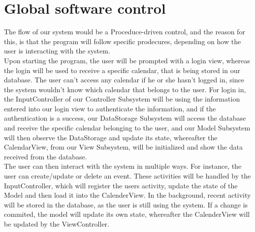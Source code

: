 \section{Global software control}
The flow of our system would be a Proceduce-driven control, and the reason for this, is that the program will follow specific prodecures, depending on how the user is interacting with the system.\\

Upon starting the program, the user will be prompted with a login view, whereas the login will be used to receive a specific calendar, that is being stored in our database. The user can't access any calendar if he or she hasn't logged in, since the system wouldn't know which calendar that belongs to the user.
For login in, the InputController of our Controller Subsystem will be using the information entered into our login view to authenticate the information, and if the authentication is a success, our DataStorage Subsystem will access the database and receive the specific calendar belonging to the user, and our Model Subsystem will then observe the DataStorage and update its state, whereafter the CalendarView, from our View Subsystem, will be initialized and show the data received from the database.\\

The user can then interact with the system in multiple ways. For instance, the user can create/update or delete an event. These activities will be handled by the InputController, which will register the users activity, update the state of the Model and then load it into the CalenderView. In the background, recent activity will be stored in the database, as the user is still using the system. If a change is commited, the model will update its own state, whereafter the CalenderView will be updated by the ViewController.\\